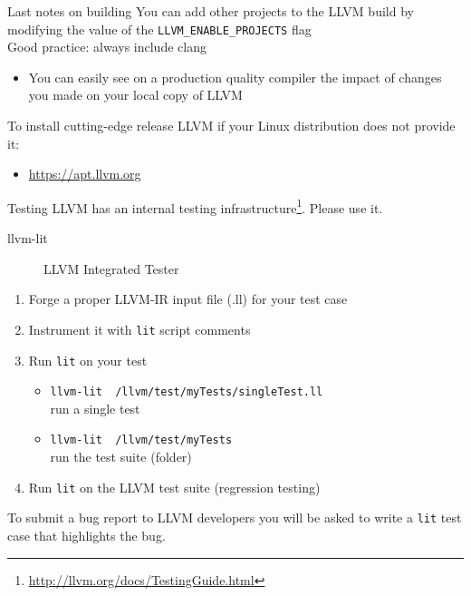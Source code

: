 \begin{frame}{Last notes on building}
You can add other projects to the LLVM build by modifying the value of the \texttt{LLVM\_ENABLE\_PROJECTS} flag\\
\bigskip
Good practice: \alert{always include clang}
\begin{itemize}
	\item You can easily see on a production quality compiler the impact of changes you made on your local copy of LLVM
\end{itemize}
\bigskip
To install cutting-edge release LLVM if your Linux distribution does not provide it:\\
\begin{itemize}
	\item \url{https://apt.llvm.org}
\end{itemize}
\end{frame}


\begin{frame}{Testing}
LLVM has an internal testing infrastructure\footnote{\url{http://llvm.org/docs/TestingGuide.html}}.
Please use it.
\\
\begin{description}
	\item[llvm-lit] LLVM Integrated Tester
\end{description}
\begin{enumerate}
	\item Forge a proper LLVM-IR input file (.ll) for your test case
	\item Instrument it with \texttt{lit} script comments
	\item Run \texttt{lit} on your test
		\begin{itemize}
			\item \texttt{llvm-lit ~/llvm/test/myTests/singleTest.ll}\\ run a single test
			\item \texttt{llvm-lit ~/llvm/test/myTests}\\ run the test suite (folder)
		\end{itemize}
	\item Run \texttt{lit} on the LLVM test suite (regression testing)
\end{enumerate}
\vfill
To submit a bug report to LLVM developers you will be asked to write a \texttt{lit} test case that highlights the bug.
\end{frame}
